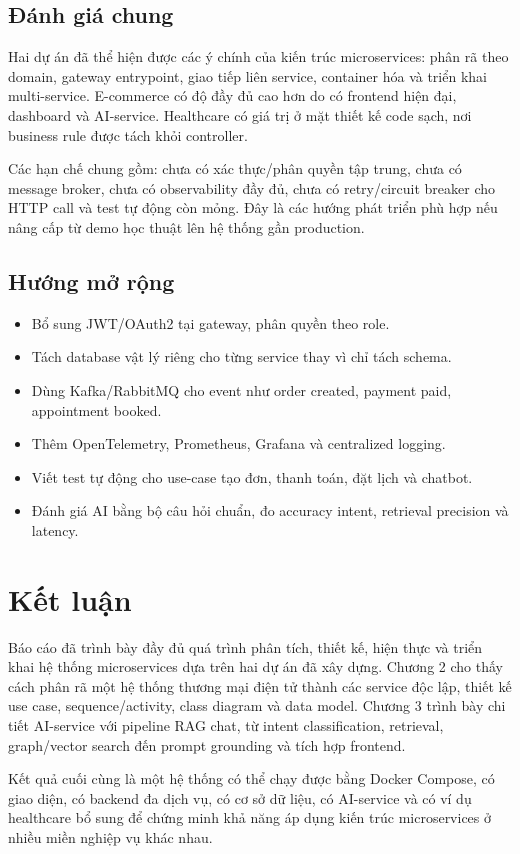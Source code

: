 \documentclass[12pt,a4paper]{report}
\begin{document}
\section{Đánh giá chung}
Hai dự án đã thể hiện được các ý chính của kiến trúc microservices: phân rã theo domain, gateway entrypoint, giao tiếp liên service, container hóa và triển khai multi-service. E-commerce có độ đầy đủ cao hơn do có frontend hiện đại, dashboard và AI-service. Healthcare có giá trị ở mặt thiết kế code sạch, nơi business rule được tách khỏi controller.

Các hạn chế chung gồm: chưa có xác thực/phân quyền tập trung, chưa có message broker, chưa có observability đầy đủ, chưa có retry/circuit breaker cho HTTP call và test tự động còn mỏng. Đây là các hướng phát triển phù hợp nếu nâng cấp từ demo học thuật lên hệ thống gần production.

\section{Hướng mở rộng}
\begin{itemize}
  \item Bổ sung JWT/OAuth2 tại gateway, phân quyền theo role.
  \item Tách database vật lý riêng cho từng service thay vì chỉ tách schema.
  \item Dùng Kafka/RabbitMQ cho event như order created, payment paid, appointment booked.
  \item Thêm OpenTelemetry, Prometheus, Grafana và centralized logging.
  \item Viết test tự động cho use-case tạo đơn, thanh toán, đặt lịch và chatbot.
  \item Đánh giá AI bằng bộ câu hỏi chuẩn, đo accuracy intent, retrieval precision và latency.
\end{itemize}

\chapter*{Kết luận}
Báo cáo đã trình bày đầy đủ quá trình phân tích, thiết kế, hiện thực và triển khai hệ thống microservices dựa trên hai dự án đã xây dựng. Chương 2 cho thấy cách phân rã một hệ thống thương mại điện tử thành các service độc lập, thiết kế use case, sequence/activity, class diagram và data model. Chương 3 trình bày chi tiết AI-service với pipeline RAG chat, từ intent classification, retrieval, graph/vector search đến prompt grounding và tích hợp frontend.

Kết quả cuối cùng là một hệ thống có thể chạy được bằng Docker Compose, có giao diện, có backend đa dịch vụ, có cơ sở dữ liệu, có AI-service và có ví dụ healthcare bổ sung để chứng minh khả năng áp dụng kiến trúc microservices ở nhiều miền nghiệp vụ khác nhau.
\end{document}
